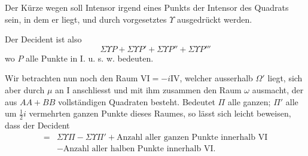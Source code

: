 Der Kürze wegen soll Intensor irgend eines Punkts der Intensor des Quadrats sein, in dem er liegt, und durch vorgesetztes $\Upsilon$ ausgedrückt werden.

Der Decident ist also
\[
\Sigma\Upsilon P+\Sigma\Upsilon P'+\Sigma\Upsilon P''+\Sigma\Upsilon P'''
\]
wo $P$ alle Punkte in I. u. s. w. bedeuten.


Wir betrachten nun noch den Raum $\mathrm{VI}=-i\mathrm{IV}$, welcher ausserhalb $\Omega'$ liegt, sich aber durch $\mu$ an I anschliesst und mit ihm zusammen den Raum $\omega$ ausmacht, der aus $AA+BB$ vollständigen Quadraten besteht. Bedeutet $\Pi$ alle ganzen; $\Pi'$ alle um $\frac12i$ vermehrten ganzen Punkte dieses Raumes, so lässt sich leicht beweisen, dass der Decident
\[
\begin{aligned}
={}&\Sigma\Upsilon\Pi-\Sigma\Upsilon\Pi'+\text{Anzahl aller ganzen Punkte innerhalb VI}\\
&-\text{Anzahl aller halben Punkte innerhalb VI.}
\end{aligned}
\]

